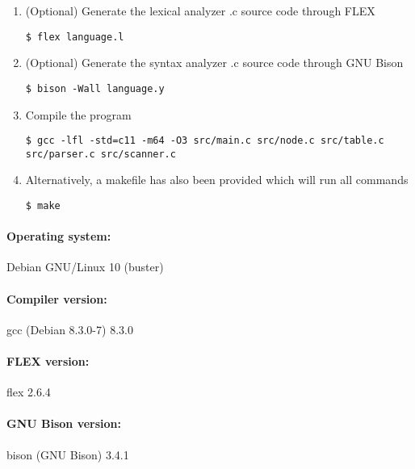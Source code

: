 \documentclass[12pt]{article}
\begin{document}
\begin{enumerate}
\item (Optional) Generate the lexical analyzer .c source code through FLEX
\begin{lstlisting}
$ flex language.l
\end{lstlisting}

\item (Optional) Generate the syntax analyzer .c source code through GNU Bison
\begin{lstlisting}
$ bison -Wall language.y
\end{lstlisting}

\item Compile the program
\begin{lstlisting}
$ gcc -lfl -std=c11 -m64 -O3 src/main.c src/node.c src/table.c src/parser.c src/scanner.c
\end{lstlisting}

\item Alternatively, a makefile has also been provided which will run all commands
\begin{lstlisting}
$ make
\end{lstlisting}
\end{enumerate}

\paragraph{Operating system:} Debian GNU/Linux 10 (buster)
\paragraph{Compiler version:} gcc (Debian 8.3.0-7) 8.3.0
\paragraph{FLEX version:} flex 2.6.4
\paragraph{GNU Bison version:} bison (GNU Bison) 3.4.1
\end{document}
